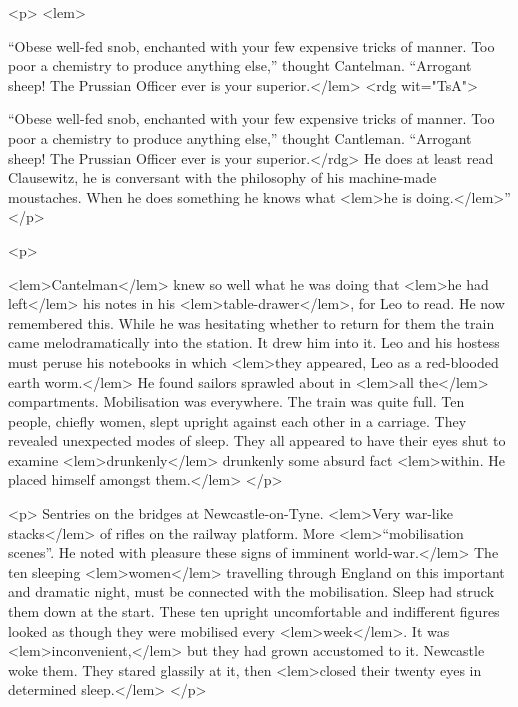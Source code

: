 				<p>
					<lem>{“Obese well-fed snob, enchanted with your few expensive tricks of manner.  Too poor a chemistry to produce anything else,” thought Cantelman. “Arrogant sheep!  The Prussian Officer ever is your superior.</lem>
					<rdg wit="TsA">{“Obese well-fed snob,
                                        enchanted with your few expensive
                                        tricks of manner.  Too poor a
                                        chemistry to produce anything else,”
                                        thought Cantleman. “Arrogant sheep!
                                        The Prussian Officer ever is your
                                        superior.</rdg>
						{} 
					He does at least read Clausewitz, he is conversant 
					with the philosophy of his machine-made moustaches. When he does something he knows 
					what 
<lem>he is doing.</lem>{}” 
 				</p>

				<p>
					
<lem>Cantelman</lem>
						{} 
					knew so well what he was doing that 
<lem>he had left</lem>
						{} 
					his notes in his 
<lem>table-drawer</lem>{}, for 
					Leo to read. He now remembered this. While he was hesitating whether to return for them 
					the train came melodramatically into the station. It drew him into it. Leo and his 
					hostess must peruse his notebooks in which 
<lem>they appeared, Leo as a red-blooded earth worm.</lem>
						{} 
					He found sailors sprawled 
					about in 
<lem>all the</lem>
						{} 
					compartments. Mobilisation was everywhere. The train was quite full. 
					Ten people, chiefly women, slept upright against each other in a carriage. They revealed 
					unexpected modes of sleep. They all appeared to have their eyes shut to examine 
<lem>drunkenly</lem>
						{} 
					drunkenly some absurd fact 
<lem>within. He placed himself amongst them.</lem>
						{} 
 				</p>

				<p>
					Sentries on the bridges at Newcastle-on-Tyne.  
<lem>Very war-like stacks</lem>
						{} 
					of rifles on the railway platform. 
					More 
<lem>“mobilisation scenes”. He noted with pleasure these signs of imminent world-war.</lem>
						{} 
					The ten sleeping 
<lem>women</lem>
						{} 
					travelling through England on 
					this important and dramatic night, must be connected with the mobilisation. Sleep 
					had struck them down at the start. These ten upright uncomfortable and indifferent 
					figures looked as though they were mobilised every 
<lem>week</lem>{}. It was 
<lem>inconvenient,</lem>
						{} 
					but they had grown accustomed to it. Newcastle woke them. They stared glassily 
					at it, then 
<lem>closed their twenty eyes in determined sleep.</lem>
						{} 
 				</p>

}}
